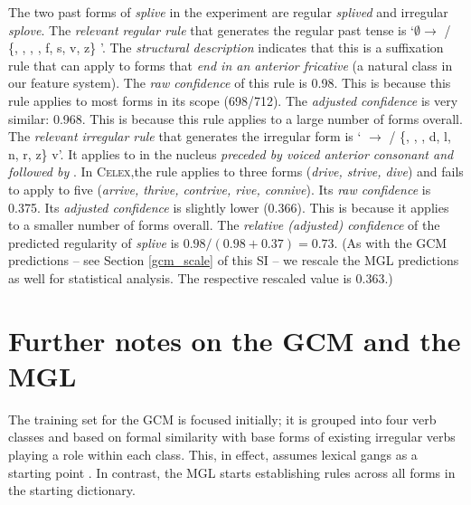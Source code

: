 \documentclass[12pt]{article}
\begin{document}
The two past forms of {\em splive} in the experiment are regular {\em splived} and irregular {\em splove}. The {\em relevant regular rule} that generates the regular past tense is `$\emptyset{} \rightarrow{}$ \textipa{[d]} / \{, , , , f, s, v, z\} \underline{\hspace{0.5cm}}'. The {\em structural description} indicates that this is a suffixation rule that can apply to forms that {\em end in an anterior fricative} (a natural class in our feature system).  The {\em raw confidence} of this rule is 0.98. This is because this rule applies to most forms in its scope (698/712). The {\em adjusted confidence} is very similar: 0.968. This is because this rule applies to a large number of forms overall. The {\em relevant irregular rule} that generates the irregular form is `\textipa{[aI]} $\rightarrow{}$ \textipa{[oU]} / \{, , , d, l, n, r, z\} \underline{\hspace{0.5cm}}v'. It applies to \textipa{[aI]} in the nucleus {\em preceded by voiced anterior consonant and followed by \textipa{[v]}}. In \textsc{Celex},the rule applies to three forms ({\em drive, strive, dive}) and fails to apply to five ({\em arrive, thrive, contrive, rive, connive}). Its {\em raw confidence} is 0.375. Its {\em adjusted confidence} is slightly lower (0.366). This is because it applies to a smaller number of forms overall. The {\em relative (adjusted) confidence} of the predicted regularity of {\em splive} is $0.98/(0.98+0.37)=0.73$. (As with the GCM predictions -- see Section \ref{gcm_scale} of this SI -- we rescale the MGL predictions as well for statistical analysis. The respective rescaled value is 0.363.)

\section{Further notes on the GCM and the MGL \label{appendixgcmvsmgl}}

The training set for the GCM is focused initially; it is grouped into four verb classes and based on formal similarity with base forms of existing irregular verbs playing a role within each class. This, in effect, assumes lexical gangs as a starting point \citep{alegre1999rule}. In contrast, the MGL starts establishing rules across all forms in the starting dictionary.
\end{document}
